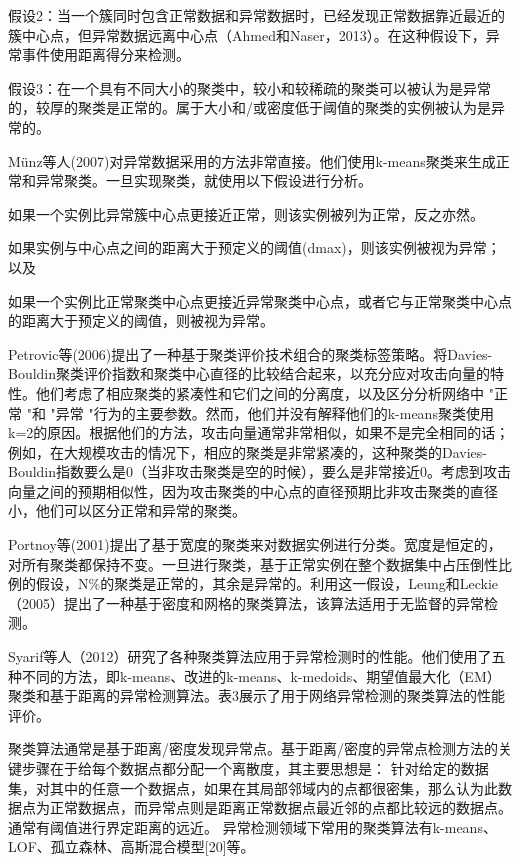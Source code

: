 假设2：当一个簇同时包含正常数据和异常数据时，已经发现正常数据靠近最近的簇中心点，但异常数据远离中心点（Ahmed和Naser，2013）。在这种假设下，异常事件使用距离得分来检测。

假设3：在一个具有不同大小的聚类中，较小和较稀疏的聚类可以被认为是异常的，较厚的聚类是正常的。属于大小和/或密度低于阈值的聚类的实例被认为是异常的。


Münz等人(2007)对异常数据采用的方法非常直接。他们使用k-means聚类来生成正常和异常聚类。一旦实现聚类，就使用以下假设进行分析。

如果一个实例比异常簇中心点更接近正常，则该实例被列为正常，反之亦然。


如果实例与中心点之间的距离大于预定义的阈值(dmax)，则该实例被视为异常；以及


如果一个实例比正常聚类中心点更接近异常聚类中心点，或者它与正常聚类中心点的距离大于预定义的阈值，则被视为异常。


Petrovic等(2006)提出了一种基于聚类评价技术组合的聚类标签策略。将Davies-Bouldin聚类评价指数和聚类中心直径的比较结合起来，以充分应对攻击向量的特性。他们考虑了相应聚类的紧凑性和它们之间的分离度，以及区分分析网络中 "正常 "和 "异常 "行为的主要参数。然而，他们并没有解释他们的k-means聚类使用k=2的原因。根据他们的方法，攻击向量通常非常相似，如果不是完全相同的话；例如，在大规模攻击的情况下，相应的聚类是非常紧凑的，这种聚类的Davies-Bouldin指数要么是0（当非攻击聚类是空的时候），要么是非常接近0。考虑到攻击向量之间的预期相似性，因为攻击聚类的中心点的直径预期比非攻击聚类的直径小，他们可以区分正常和异常的聚类。

Portnoy等(2001)提出了基于宽度的聚类来对数据实例进行分类。宽度是恒定的，对所有聚类都保持不变。一旦进行聚类，基于正常实例在整个数据集中占压倒性比例的假设，N\%的聚类是正常的，其余是异常的。利用这一假设，Leung和Leckie（2005）提出了一种基于密度和网格的聚类算法，该算法适用于无监督的异常检测。

Syarif等人（2012）研究了各种聚类算法应用于异常检测时的性能。他们使用了五种不同的方法，即k-means、改进的k-means、k-medoids、期望值最大化（EM）聚类和基于距离的异常检测算法。表3展示了用于网络异常检测的聚类算法的性能评价。



聚类算法通常是基于距离/密度发现异常点。基于距离/密度的异常点检测方法的关键步骤在于给每个数据点都分配一个离散度，其主要思想是：
针对给定的数据集，对其中的任意一个数据点，如果在其局部邻域内的点都很密集，那么认为此数据点为正常数据点，而异常点则是距离正常数据点最近邻的点都比较远的数据点。通常有阈值进行界定距离的远近。
异常检测领域下常用的聚类算法有k-means、LOF、孤立森林、高斯混合模型[20]等。

